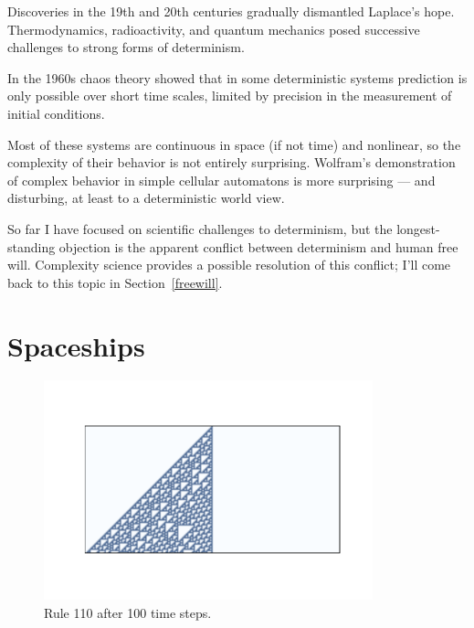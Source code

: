 \documentclass[12pt]{book}
\theoremstyle{exercise}
\begin{document}

Discoveries in the 19th and 20th centuries gradually dismantled
Laplace's hope.  Thermodynamics, radioactivity,
and quantum mechanics posed successive challenges to strong
forms of determinism.


In the 1960s chaos theory showed that in some deterministic systems
prediction is only possible over short time scales,  limited by
precision in the measurement of initial conditions.


Most of these systems are continuous in space (if not time) and
nonlinear, so the complexity of their behavior is not entirely
surprising.  Wolfram's demonstration of complex behavior in simple
cellular automatons is more surprising --- and disturbing, at least to a
deterministic world view.


So far I have focused on scientific challenges to determinism, but the
longest-standing objection is the apparent conflict between
determinism and human free will.  Complexity science provides
a possible resolution of this conflict; I'll come
back to this topic in Section~\ref{freewill}.



\section{Spaceships}
\label{spaceships}

\begin{figure}
\centerline{\includegraphics[height=2.5in]{figs/chap05-5.pdf}}
\caption{Rule 110 after 100 time steps.}
\label{chap05-5}
\end{figure}
\end{document}
